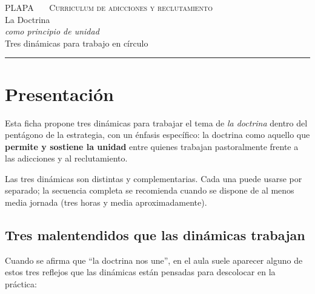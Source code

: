 \documentclass[11pt, a4paper]{article}
\begin{document}

\thispagestyle{plain}
\begin{center}
  \vspace*{1.5em}
  {\color{tenue}\scshape\small PLAPA \ \textbullet\ \ Curriculum de adicciones y reclutamiento}\\
  \vspace{2em}
  {\color{doctrinaAzul}\Huge La Doctrina}\\[0.35em]
  {\color{tinte}\LARGE\itshape como principio de unidad}\\
  \vspace{1.4em}
  {\color{tenue}\large Tres dinámicas para trabajo en círculo}\\
  \vspace{0.6em}
  {\color{regla}\rule{0.35\linewidth}{0.5pt}}
\end{center}

\vspace{2em}

\section*{Presentación}

Esta ficha propone tres dinámicas para trabajar el tema de \emph{la doctrina} dentro del pentágono de la estrategia, con un énfasis específico: la doctrina como aquello que \textbf{permite y sostiene la unidad} entre quienes trabajan pastoralmente frente a las adicciones y al reclutamiento.

Las tres dinámicas son distintas y complementarias. Cada una puede usarse por separado; la secuencia completa se recomienda cuando se dispone de al menos media jornada (tres horas y media aproximadamente).

\subsection*{Tres malentendidos que las dinámicas trabajan}

Cuando se afirma que ``la doctrina nos une'', en el aula suele aparecer alguno de estos tres reflejos que las dinámicas están pensadas para descolocar en la práctica:
\end{document}
